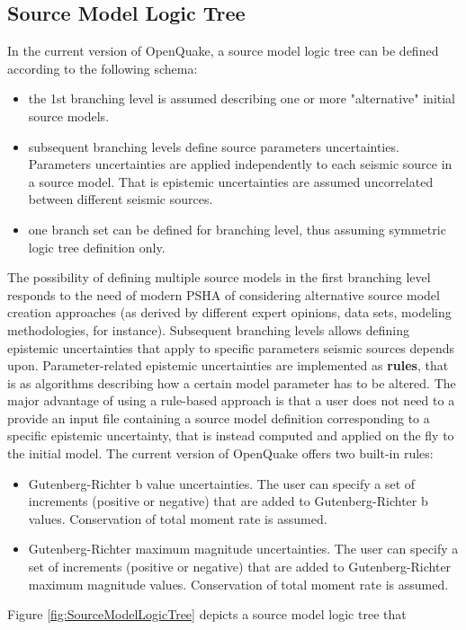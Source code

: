 \subsection{Source Model Logic Tree}
\label{hazard:source_model_logic_tree}
In the current version of OpenQuake, a source model logic tree can be defined 
according to the following schema:
\begin{itemize}
\item the 1st branching level is assumed describing one or more "alternative" 
initial source models.
\item subsequent branching levels define source parameters uncertainties. 
Parameters uncertainties are applied independently to each seismic source 
in a source model. That is epistemic uncertainties are assumed uncorrelated 
between different seismic sources.
\item one branch set can be defined for branching level, thus assuming 
symmetric logic tree definition only.
\end{itemize}
The possibility of defining multiple source models in the first branching 
level responds to the need of modern PSHA of considering alternative source 
model creation approaches (as derived by different expert opinions, data sets,
modeling methodologies, for instance). Subsequent branching levels allows 
defining epistemic uncertainties that apply to specific parameters seismic 
sources depends upon. Parameter-related epistemic uncertainties are 
implemented as \textbf{rules}, that is as algorithms describing how 
a certain model parameter has to be altered. The major advantage of 
using a rule-based approach is that a user does not need to a provide 
an input file containing a source model definition corresponding to a 
specific epistemic uncertainty, that is instead computed and applied 
on the fly to the initial model. The current version of OpenQuake offers 
two built-in rules:
\begin{itemize}
\item Gutenberg-Richter b value uncertainties. The user can specify a set 
of increments (positive or negative) that are added to Gutenberg-Richter 
b values. Conservation of total moment rate is assumed.
\item Gutenberg-Richter maximum magnitude uncertainties. The user can specify
a set of increments (positive or negative) that are added to Gutenberg-Richter 
maximum magnitude values. Conservation of total moment rate is assumed.
\end{itemize}
Figure \ref{fig:SourceModelLogicTree} depicts a source model logic tree that 
